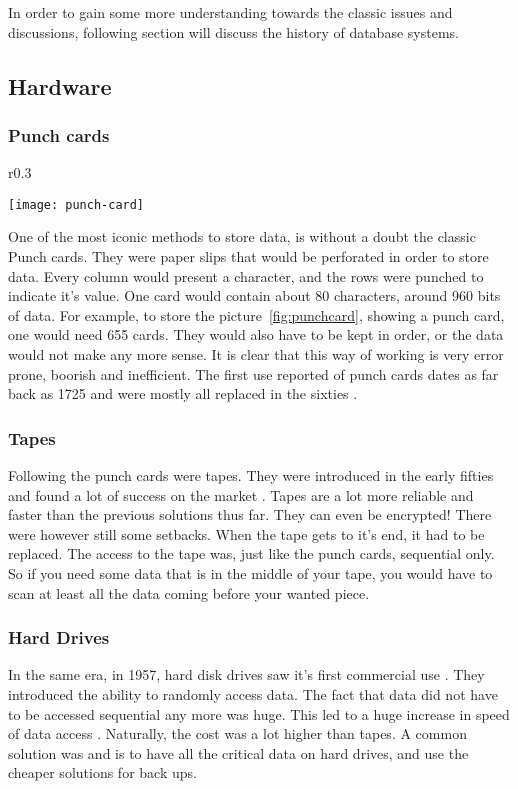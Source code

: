 In order to gain some more understanding towards the classic issues and discussions, following section will discuss the history of database systems. 

\subsection{Hardware}

\subsubsection{Punch cards}
\begin{wrapfigure}{r}{0.3\textwidth}
	
	\texttt{[image: punch-card]} 
	\caption{Punchcard \autocite{punch}}
	\label{fig:punchcard}
\end{wrapfigure}
One of the most iconic methods to store data, is without a doubt the classic Punch cards. They were paper slips that would be perforated in order to store data. Every column would present a character, and the rows were punched to indicate it's value. One card would contain about 80 characters, around 960 bits of data. For example, to store the picture~\ref{fig:punchcard}, showing a punch card, one would need 655 cards. They would also have to be kept in order, or the data would not make any more sense. It is clear that this way of working is very error prone, boorish and inefficient. The first use reported of punch cards dates as far back as 1725 and were mostly all replaced in the sixties \autocite{punch}.

\subsubsection{Tapes}
Following the punch cards were tapes. They were introduced in the early fifties and found a lot of success on the market \autocite{tape}. Tapes are a lot more reliable and faster than the previous solutions thus far. They can even be encrypted! There were however still some setbacks. When the tape gets to it's end, it had to be replaced. The access to the tape was, just like the punch cards, sequential only. So if you need some data that is in the middle of your tape, you would have to scan at least all the data coming before your wanted piece. 

\subsubsection{Hard Drives}
In the same era, in 1957, hard disk drives saw it's first commercial use \cite{hdd}. They introduced the ability to randomly access data. The fact that data did not have to be accessed sequential any more was huge. This led to a huge increase in speed of data access \autocite{hdd}. Naturally, the cost was a lot higher than tapes. A common solution was and is to have all the critical data on hard drives, and use the cheaper solutions for back ups.

